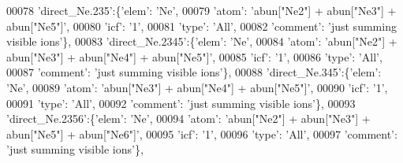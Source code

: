 \begin{DoxyCode}
00078                          \textcolor{stringliteral}{'direct\_Ne.235'}:\{\textcolor{stringliteral}{'elem'}: \textcolor{stringliteral}{'Ne'},
00079                                        \textcolor{stringliteral}{'atom'}: \textcolor{stringliteral}{'abun["Ne2"] + abun["Ne3"] + abun["Ne5"]'},
00080                                        \textcolor{stringliteral}{'icf'}: \textcolor{stringliteral}{'1'},
00081                                        \textcolor{stringliteral}{'type'}: \textcolor{stringliteral}{'All'},
00082                                        \textcolor{stringliteral}{'comment'}: \textcolor{stringliteral}{'just summing visible ions'}\},
00083                          \textcolor{stringliteral}{'direct\_Ne.2345'}:\{\textcolor{stringliteral}{'elem'}: \textcolor{stringliteral}{'Ne'},
00084                                        \textcolor{stringliteral}{'atom'}: \textcolor{stringliteral}{'abun["Ne2"] + abun["Ne3"] + abun["Ne4"] + abun["Ne5"]'},
00085                                        \textcolor{stringliteral}{'icf'}: \textcolor{stringliteral}{'1'},
00086                                        \textcolor{stringliteral}{'type'}: \textcolor{stringliteral}{'All'},
00087                                        \textcolor{stringliteral}{'comment'}: \textcolor{stringliteral}{'just summing visible ions'}\},
00088                          \textcolor{stringliteral}{'direct\_Ne.345'}:\{\textcolor{stringliteral}{'elem'}: \textcolor{stringliteral}{'Ne'},
00089                                        \textcolor{stringliteral}{'atom'}: \textcolor{stringliteral}{'abun["Ne3"] + abun["Ne4"] + abun["Ne5"]'},
00090                                        \textcolor{stringliteral}{'icf'}: \textcolor{stringliteral}{'1'},
00091                                        \textcolor{stringliteral}{'type'}: \textcolor{stringliteral}{'All'},
00092                                        \textcolor{stringliteral}{'comment'}: \textcolor{stringliteral}{'just summing visible ions'}\},
00093                          \textcolor{stringliteral}{'direct\_Ne.2356'}:\{\textcolor{stringliteral}{'elem'}: \textcolor{stringliteral}{'Ne'},
00094                                        \textcolor{stringliteral}{'atom'}: \textcolor{stringliteral}{'abun["Ne2"] + abun["Ne3"] + abun["Ne5"] + abun["Ne6"]'},
00095                                        \textcolor{stringliteral}{'icf'}: \textcolor{stringliteral}{'1'},
00096                                        \textcolor{stringliteral}{'type'}: \textcolor{stringliteral}{'All'},
00097                                        \textcolor{stringliteral}{'comment'}: \textcolor{stringliteral}{'just summing visible ions'}\},

\end{DoxyCode}
